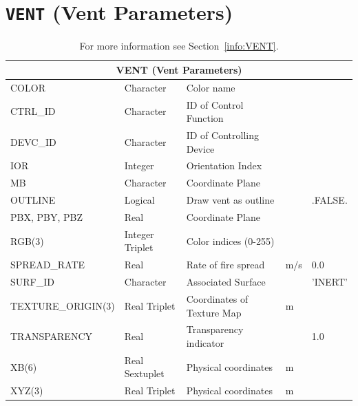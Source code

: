 \documentclass[11pt]{book}
\begin{document}
\vspace{\baselineskip}

\vfill

\section{\texorpdfstring{{\tt VENT}}{VENT} (Vent Parameters)}

\hspace{1in}

\begin{table}[H]
\caption{For more information see Section~\ref{info:VENT}.}\label{tbl:VENT}
\noindent
\begin{tabularx}{\textwidth}{@{\extracolsep{\fill}}|l|l|l|l|l|}
\hline
\multicolumn{5}{|c|}{{\ct VENT} (Vent Parameters)} \\ \hline \hline
{\ct COLOR    }             & Character         & Color name                        &             &                     \\ \hline
{\ct CTRL\_ID }             & Character         & {\ct ID} of Control Function      &             &                     \\ \hline
{\ct DEVC\_ID }             & Character         & {\ct ID} of Controlling Device    &             &                     \\ \hline
{\ct IOR}                   & Integer           & Orientation Index                 &             &                     \\ \hline
{\ct MB    }                & Character         & Coordinate Plane                  &             &                     \\ \hline
{\ct OUTLINE}               & Logical           & Draw vent as outline              &             &  {\ct .FALSE.}      \\ \hline
{\ct PBX, PBY, PBZ  }       & Real              & Coordinate Plane                  &             &                     \\ \hline
{\ct RGB(3)   }             & Integer Triplet   & Color indices (0-255)             &             &                     \\ \hline
{\ct SPREAD\_RATE}          & Real              & Rate of fire spread               & m/s         &  0.0                \\ \hline
{\ct SURF\_ID}              & Character         & Associated Surface                &             &  {\ct 'INERT'}      \\ \hline
{\ct TEXTURE\_ORIGIN(3)}    & Real Triplet      & Coordinates of Texture Map        & m           &                     \\ \hline
{\ct TRANSPARENCY}          & Real              & Transparency indicator            &             &   1.0               \\ \hline
{\ct XB(6) }                & Real Sextuplet    & Physical coordinates              & m           &                     \\ \hline
{\ct XYZ(3) }               & Real Triplet      & Physical coordinates              & m           &                     \\ \hline
\end{tabularx}
\end{table}
\end{document}
